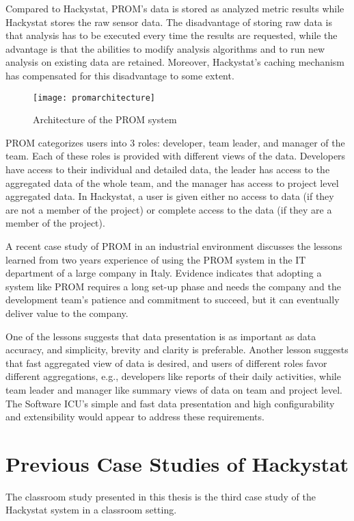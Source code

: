 Compared to Hackystat, PROM's data is stored as analyzed metric results while Hackystat stores the raw sensor data. The disadvantage of storing raw data is that analysis has to be executed every time the results are requested, while the advantage is that the abilities to modify analysis algorithms and to run new analysis on existing data are retained. Moreover, Hackystat's caching mechanism has compensated for this disadvantage to some extent.

\begin{figure}[htbp]
     \centering
     \texttt{[image: promarchitecture]}
     \caption{Architecture of the PROM system}
     \label{fig:promarchitecture}
\end{figure}

PROM categorizes users into 3 roles: developer, team leader, and manager of the team. Each of these roles is provided with different views of the data. Developers have access to their individual and detailed data, the leader has access to the aggregated data of the whole team, and the manager has access to project level aggregated data. In Hackystat, a user is given either no access to data (if they are not a member of the project) or complete access to the data (if they are a member of the project).

A recent case study of PROM in an industrial environment\cite{prom09} discusses the lessons learned from two years experience of using the PROM system in the IT department of a large company in Italy. Evidence indicates that adopting a system like PROM requires a long set-up phase and needs the company and the development team's patience and commitment to succeed, but it can eventually deliver value to the company. 

One of the lessons suggests that data presentation is as important as data accuracy, and simplicity, brevity and clarity is preferable. Another lesson suggests that fast aggregated view of data is desired, and users of different roles favor different aggregations, e.g., developers like reports of their daily activities, while team leader and manager like summary views of data on team and project level. The Software ICU's simple and fast data presentation and high configurability and extensibility would appear to address these requirements.


\section {Previous Case Studies of Hackystat}
\label{oldhackystat}
The classroom study presented in this thesis is the third case study of the Hackystat system in a classroom setting. 

